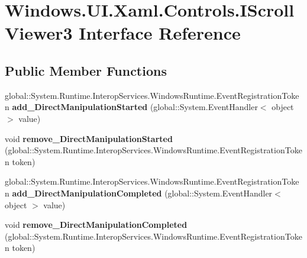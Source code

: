 \hypertarget{interface_windows_1_1_u_i_1_1_xaml_1_1_controls_1_1_i_scroll_viewer3}{}\section{Windows.\+U\+I.\+Xaml.\+Controls.\+I\+Scroll\+Viewer3 Interface Reference}
\label{interface_windows_1_1_u_i_1_1_xaml_1_1_controls_1_1_i_scroll_viewer3}
\subsection*{Public Member Functions}
\begin{DoxyCompactItemize}
\item 
\mbox{\label{interface_windows_1_1_u_i_1_1_xaml_1_1_controls_1_1_i_scroll_viewer3_a0839b9502b9866f437c3f3f23c2c0f79}} 
global\+::\+System.\+Runtime.\+Interop\+Services.\+Windows\+Runtime.\+Event\+Registration\+Token {\bfseries add\+\_\+\+Direct\+Manipulation\+Started} (global\+::\+System.\+Event\+Handler$<$ object $>$ value)
\item 
\mbox{\label{interface_windows_1_1_u_i_1_1_xaml_1_1_controls_1_1_i_scroll_viewer3_a75d6c9a9bf666134494a9293cd9bfa83}} 
void {\bfseries remove\+\_\+\+Direct\+Manipulation\+Started} (global\+::\+System.\+Runtime.\+Interop\+Services.\+Windows\+Runtime.\+Event\+Registration\+Token token)
\item 
\mbox{\label{interface_windows_1_1_u_i_1_1_xaml_1_1_controls_1_1_i_scroll_viewer3_a111ec1d571f2a6f03d6e721b6314de30}} 
global\+::\+System.\+Runtime.\+Interop\+Services.\+Windows\+Runtime.\+Event\+Registration\+Token {\bfseries add\+\_\+\+Direct\+Manipulation\+Completed} (global\+::\+System.\+Event\+Handler$<$ object $>$ value)
\item 
\mbox{\label{interface_windows_1_1_u_i_1_1_xaml_1_1_controls_1_1_i_scroll_viewer3_ac49adea893c6168aba5af298913c0b69}} 
void {\bfseries remove\+\_\+\+Direct\+Manipulation\+Completed} (global\+::\+System.\+Runtime.\+Interop\+Services.\+Windows\+Runtime.\+Event\+Registration\+Token token)

\end{DoxyCompactItemize}

